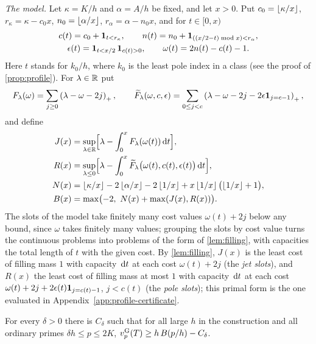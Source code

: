 \emph{The model.} Let $\kappa=K/h$ and $\alpha=A/h$ be fixed, and let $x>0$. Put
$c_0=\left\lfloor \kappa/x\right\rfloor$, $r_\kappa=\kappa-c_0x$, $n_0=\left\lfloor \alpha/x\right\rfloor$, $r_\alpha=\alpha-n_0x$, and
for $t\in[0,x)$
\begin{gather*}
  c(t)=c_0+\mathbf{1}_{t<r_\kappa},\qquad n(t)=n_0+\mathbf{1}_{((x/2-t)\bmod x)<r_\alpha},\\
  \epsilon(t)=\mathbf{1}_{t<x/2}\,\mathbf{1}_{c(t)>0},\qquad \omega(t)=2n(t)-c(t)-1.
\end{gather*}
Here $t$ stands for $k_0/h$, where $k_0$ is the least pole index in a class (see the proof of
\cref{prop:profile}). For $\lambda\in\mathbb{R}$ put
\[
  F_\lambda(\omega)=\sum_{j\ge0}\left(\lambda-\omega-2j\right)_{+},\qquad
  \widetilde F_\lambda(\omega,c,\epsilon)=\sum_{0\le j<c}\left(\lambda-\omega-2j-2\epsilon\mathbf{1}_{j=c-1}\right)_{+},
\]
and define
\begin{align*}
  J(x)&=\sup_{\lambda\in\mathbb{R}}\Bigl[\lambda-\int_0^xF_\lambda(\omega(t))\,\mathrm{d} t\Bigr],\\
  R(x)&=\sup_{\lambda\le0}\Bigl[\lambda-\int_0^x\widetilde F_\lambda\bigl(\omega(t),c(t),
  \epsilon(t)\bigr)\,\mathrm{d} t\Bigr],\\
  N(x)&=\left\lfloor \kappa/x\right\rfloor-2\left\lfloor \alpha/x\right\rfloor-2\left\lfloor 1/x\right\rfloor+x\left\lfloor 1/x\right\rfloor\bigl(\left\lfloor 1/x\right\rfloor+1\bigr),\\
  B(x)&=\max\bigl(-2,\ N(x)+\max(J(x),R(x))\bigr).
\end{align*}
The slots of the model take finitely many cost values $\omega(t)+2j$ below any bound, since
$\omega$ takes finitely many values; grouping the slots by cost value turns the continuous problems
into problems of the form of \cref{lem:filling}, with capacities the total length of $t$ with the
given cost. By \cref{lem:filling}, $J(x)$ is the least cost of filling mass $1$ with capacity $\,\mathrm{d} t$ at each
cost $\omega(t)+2j$ (the \emph{jet slots}), and $R(x)$ the least cost of filling mass at most $1$
with capacity $\,\mathrm{d} t$ at each cost $\omega(t)+2j+2\epsilon(t)\mathbf{1}_{j=c(t)-1}$, $j<c(t)$ (the
\emph{pole slots}); this primal form is the one evaluated in Appendix~\ref{app:profile-certificate}.

\begin{proposition}\label{prop:profile}
For every $\delta>0$ there is $C_\delta$ such that for all large $h$ in the construction and all
ordinary primes $\delta h\le p\le2K$, $v_{p}^{\mathrm{G}}(T)\ge h\,B(p/h)-C_\delta$.
\end{proposition}

